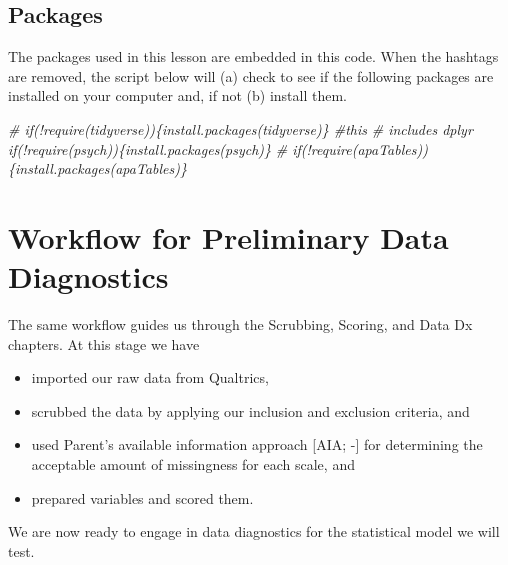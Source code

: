 \documentclass[
  11pt,
]{book}
\newenvironment{Shaded}{\begin{snugshade}}{\end{snugshade}}
\newcommand{\CommentTok}[1]{\textcolor[rgb]{0.37,0.37,0.37}{\textit{#1}}}
\providecommand{\tightlist}{%
  \setlength{\itemsep}{0pt}\setlength{\parskip}{0pt}}
\begin{document}
\hypertarget{packages-2}{%
\subsection{Packages}\label{packages-2}}

The packages used in this lesson are embedded in this code. When the hashtags are removed, the script below will (a) check to see if the following packages are installed on your computer and, if not (b) install them.

\begin{Shaded}
\begin{Highlighting}[]
\CommentTok{\# if(!require(tidyverse))\{install.packages(\textquotesingle{}tidyverse\textquotesingle{})\} \#this}
\CommentTok{\# includes dplyr if(!require(psych))\{install.packages(\textquotesingle{}psych\textquotesingle{})\}}
\CommentTok{\# if(!require(apaTables))\{install.packages(\textquotesingle{}apaTables\textquotesingle{})\}}
\end{Highlighting}
\end{Shaded}

\hypertarget{workflow-for-preliminary-data-diagnostics}{%
\section{Workflow for Preliminary Data Diagnostics}\label{workflow-for-preliminary-data-diagnostics}}

The same workflow guides us through the Scrubbing, Scoring, and Data Dx chapters. At this stage we have

\begin{itemize}
\tightlist
\item
  imported our raw data from Qualtrics,
\item
  scrubbed the data by applying our inclusion and exclusion criteria, and
\item
  used Parent's available information approach {[}AIA; -\citet{parent_handling_2013}{]} for determining the acceptable amount of missingness for each scale, and
\item
  prepared variables and scored them.
\end{itemize}

We are now ready to engage in data diagnostics for the statistical model we will test.
\end{document}
